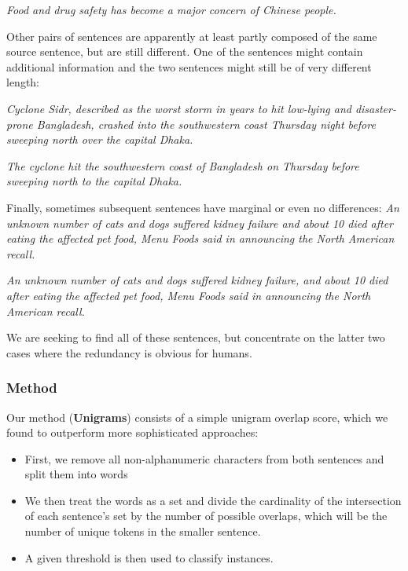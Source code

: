 \documentclass[a4paper,10pt]{scrartcl}
\theoremstyle{style}
\begin{document}
\textit{Food and drug safety has become a major concern of Chinese people.}

Other pairs of sentences are apparently at least partly composed of the same source sentence, but are still different. One of the sentences might contain additional information and the two sentences might still be of very different length:

\textit{Cyclone Sidr, described as the worst storm in years to hit low-lying and disaster-prone Bangladesh, crashed into the southwestern coast Thursday night before sweeping north over the capital Dhaka.}

\textit{The cyclone hit the southwestern coast of Bangladesh on Thursday before sweeping north to the capital Dhaka.}

Finally, sometimes subsequent sentences have marginal or even no differences:
\textit{An unknown number of cats and dogs suffered kidney failure and about 10 died after eating the affected pet food, Menu Foods said in announcing the North American recall.}

\textit{An unknown number of cats and dogs suffered kidney failure, and about 10 died after eating the affected pet food, Menu Foods said in announcing the North American recall.}

We are seeking to find all of these sentences, but concentrate on the latter two cases where the redundancy is obvious for humans.

\subsubsection{Method}
\label{s_unigrams}

Our method (\textbf{Unigrams}) consists of a simple unigram overlap score, which we found to outperform more sophisticated approaches:

\begin{itemize}
\item First, we remove all non-alphanumeric characters from both sentences and split them into words
\item We then treat the words as a set and divide the cardinality of the intersection of each sentence's set by the number of possible overlaps, which will be the number of unique tokens in the smaller sentence.
\item A given threshold is then used to classify instances.
\end{itemize}
\end{document}
